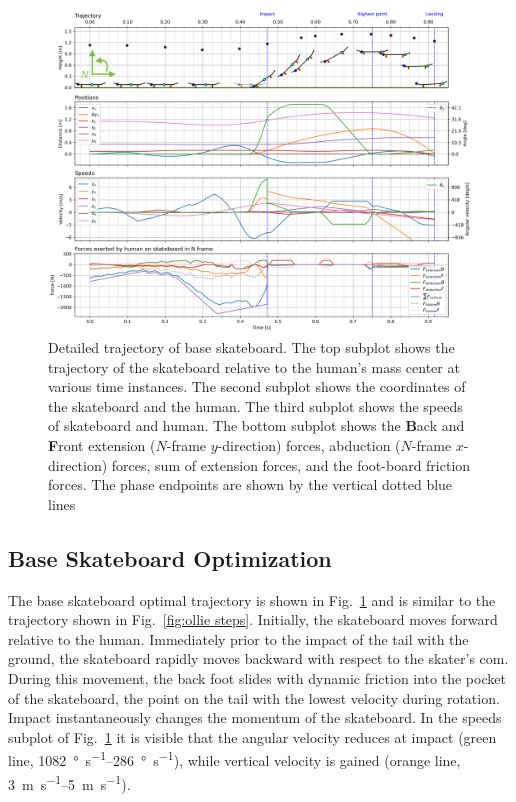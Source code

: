 \documentclass[default,iicol]{sn-jnl}
\begin{document}
\begin{figure}
    \centering
    \includegraphics[trim={0cm 0cm 0cm 0cm},clip,width=\textwidth]{paper/figure/Fig6.png}
    \caption[Trajectory, positions, speeds, and forces of base optimization]{Detailed trajectory of base skateboard. The top subplot shows the trajectory of the skateboard relative to the human's mass center at various time instances. The second subplot shows the coordinates of the skateboard and the human. The third subplot shows the speeds of skateboard and human. The bottom subplot shows the \textbf{B}ack and \textbf{F}ront extension ($N$-frame $y$-direction) forces, abduction ($N$-frame $x$-direction) forces, sum of extension forces, and the  foot-board friction forces. The phase endpoints are shown by the vertical dotted blue lines}\label{f_noparameter}
\end{figure}

\subsection{Base Skateboard Optimization}

The base skateboard optimal trajectory is shown in Fig.~\ref{f_noparameter} and is similar to the trajectory shown in Fig.~\ref{fig:ollie steps}.
Initially, the skateboard moves forward relative to the human. Immediately prior to the impact of the tail with the ground, the skateboard rapidly moves backward with respect to the skater's \gls{com}. During this movement, the back foot slides with dynamic friction into the pocket of the skateboard, the point on the tail with the lowest velocity during rotation. 
Impact instantaneously changes the momentum of the skateboard.
In the speeds subplot of Fig.~\ref{f_noparameter} it is visible that the angular velocity reduces at impact (green line, \SIrange{1082}{286}{\degree\per\second}), while vertical velocity is gained (orange line, \SIrange{3}{5}{\meter\per\second}).
\end{document}

